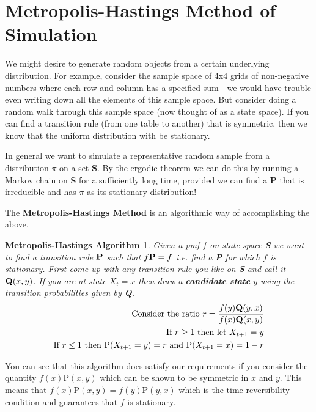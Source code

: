 \section{Metropolis-Hastings Method of Simulation}
We might desire to generate random objects from a certain underlying distribution. For example, consider the sample space of 4x4 grids of non-negative numbers where each row and column has a specified sum - we would have trouble even writing down all the elements of this sample space. But consider doing a random walk through this sample space (now thought of as a state space). If you can find a transition rule (from one table to another) that is symmetric, then we know that the uniform distribution with be stationary. \n

In general we want to simulate a representative random sample from a distribution $\pi$ on a set \textbf{S}.  By the ergodic theorem we can do this by running a Markov chain on \textbf{S} for a sufficiently long time, provided we can find a \textbf{P} that is irreducible and has $\pi$ as its stationary distribution!\n

The \textbf{Metropolis-Hastings Method} is an algorithmic way of accomplishing the above.

\newtheorem*{MH}{Metropolis-Hastings Algorithm}
\begin{MH}
Given a pmf $f$ on state space \textbf{S} we want to find a transition rule $\bold{P}$ such that $f\bold{P} = f$ i.e. find a \textbf{P} for which $f$ is stationary. 
\nn
First come up with any transition rule you like on \textbf{S} and call it $\bold{Q}(x,y)$.
\nn
If you are at state $X_t = x$ then draw a \textbf{candidate state} $y$ using the transition probabilities given by \textbf{Q}.
\nn
\begin{align*}
\textrm{Consider the ratio } r = \frac{f(y)\bold{Q}(y,x)}{f(x)\bold{Q}(x,y)}\\
\textrm{If $r\geq1$ then let } X_{t+1}=y\\
\textrm{If $r\leq1$ then }\mathrm{P}( X_{t+1} = y ) = r \textrm{ and } \mathrm{P}( X_{t+1} = x) = 1-r
\end{align*}
\end{MH}

You can see that this algorithm does satisfy our requirements if you consider the quantity $f(x)\mathrm{P}(x,y)$ which can be shown to be symmetric in $x$ and $y$. This means that $f(x)\mathrm{P}(x,y) = f(y)\mathrm{P}(y,x)$ which is the time reversibility condition and guarantees that $f$ is stationary.
\newline

